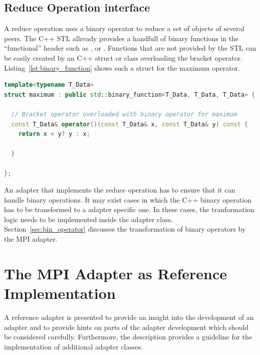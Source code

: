 \subsection{Reduce Operation interface}
A reduce operation uses a binary operator to reduce a set
of objects of several peers. The C++ STL allready provides a handfull of binary
functions in the ``functional'' header such as ,
 or 
\cite{ref:functional}. Functions that are not provided by the STL can
be easily created by an C++ struct or class overloading the bracket
operator. Listing~\ref{lst:binary_function} shows such a struct for
the maximum operator.

\begin{lstlisting}[language=C++, breaklines=false, label={lst:binary_function}]
template<typename T_Data>
struct maximum : public std::binary_function<T_Data, T_Data, T_Data> {

  // Bracket operator overloaded with binary operator for maximum
  const T_Data& operator()(const T_Data& x, const T_Data& y) const {
    return x < y? y : x;

  }

};
\end{lstlisting}

\noindent An adapter that implements the reduce operation has to
ensure that it can handle binary operations.  It may exist cases in
which the C++ binary operation has to be transformed to a adapter
specific one.  In these cases, the tranformation logic needs to be
implemented inside the adapter class.  Section~\ref{sec:bin_operator}
discusses the transformation of binary operators by the MPI
adapter.

\section{The MPI Adapter as Reference Implementation}
\label{sec:cal_mpi_adapter}

A reference adapter is presented to provide an insight into the
development of an adapter and to provide hints on parts of the adapter
development which should be considered carefully. Furthermore, the
description provides a guideline for the implementation of additional
adapter classes.

